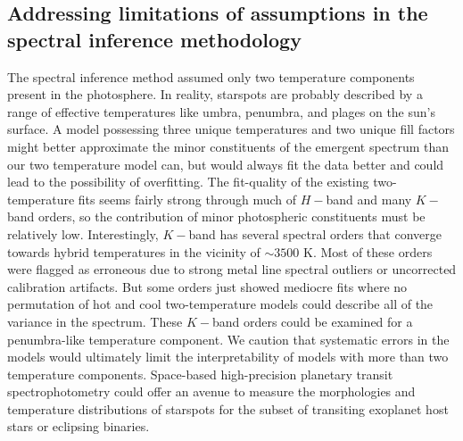 \documentclass[twocolumn]{emulateapj}%
\begin{document}
\subsection{Addressing limitations of assumptions in the spectral inference methodology}

The spectral inference method assumed only two temperature components present in the photosphere.  In reality, starspots are probably described by a range of effective temperatures like umbra, penumbra, and plages on the sun's surface.  A model possessing three unique temperatures and two unique fill factors might better approximate the minor constituents of the emergent spectrum than our two temperature model can, but would always fit the data better and could lead to the possibility of overfitting.  The fit-quality of the existing two-temperature fits seems fairly strong through much of $H-$band and many $K-$band orders, so the contribution of minor photospheric constituents must be relatively low.  Interestingly, $K-$band has several spectral orders that converge towards hybrid temperatures in the vicinity of $\sim3500$ K.  Most of these orders were flagged as erroneous due to strong metal line spectral outliers or uncorrected calibration artifacts.  But some orders just showed mediocre fits where no permutation of hot and cool two-temperature models could describe all of the variance in the spectrum.  These $K-$band orders could be examined for a penumbra-like temperature component.  We caution that systematic errors in the models would ultimately limit the interpretability of models with more than two temperature components.  Space-based high-precision planetary transit spectrophotometry could offer an avenue to measure the morphologies and temperature distributions of starspots for the subset of transiting exoplanet host stars or eclipsing binaries.
\end{document}
